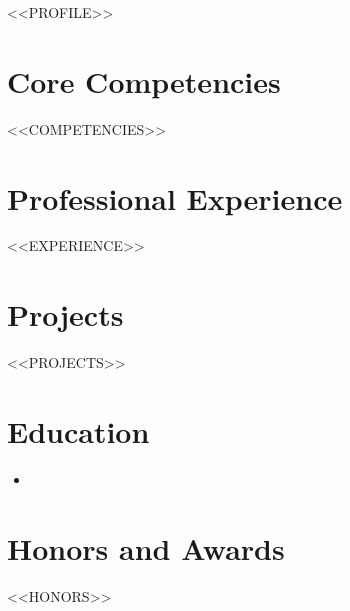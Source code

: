 \documentclass[11pt,a4paper,sans]{moderncv}
\begin{document}
\makecvtitle

\vspace{2pt}
\small{<<PROFILE>>}

\section{Core Competencies}
\vspace{1pt}
\begin{itemize}
<<COMPETENCIES>>
\end{itemize}

\section{Professional Experience}
\vspace{3pt}
\begin{itemize}
<<EXPERIENCE>>
\end{itemize}

\section{Projects}
\vspace{3pt}
\begin{itemize}
<<PROJECTS>>
\end{itemize}

\section{Education}
\vspace{1pt}
\begin{itemize}
\item{}
\end{itemize}

\section{Honors and Awards}
\vspace{1pt}
\begin{itemize}
<<HONORS>>
\end{itemize}
\end{document}

